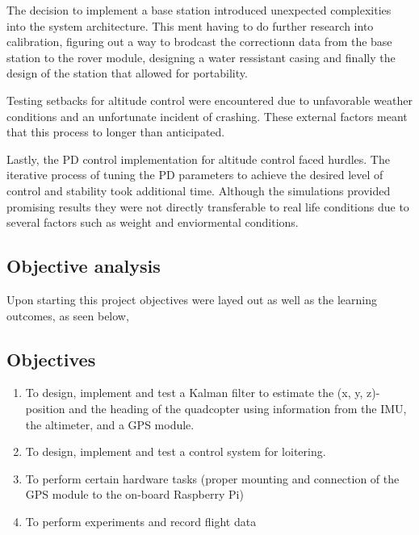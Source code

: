 \documentclass{article}
\begin{document}
The decision to implement a base station introduced unexpected complexities into
the system architecture. This ment having to do further research into
calibration, figuring out a way to brodcast the correctionn data from the base
station to the rover module, designing a water ressistant casing and finally the
design of the station that allowed for portability. 

Testing setbacks for altitude control were encountered due to unfavorable
weather conditions and an unfortunate incident of crashing. These external
factors meant that this process to longer than anticipated.

Lastly, the PD control implementation for altitude control faced hurdles. The
iterative process of tuning the PD parameters to achieve the desired level of
control and stability took additional time. Although the simulations provided
promising results they were not directly transferable to real life conditions
due to several factors such as weight and enviormental conditions.

\subsection{Objective analysis}
Upon starting this project objectives were layed out as well as the learning
outcomes, as seen below, 
\subsection*{Objectives}
\begin{enumerate}
  \item To design, implement and test a Kalman filter to estimate the (x, y, z)-
  position and the heading of the quadcopter using information from the IMU, the
  altimeter, and a GPS module.
  \item To design, implement and test a control system for loitering.
  \item To perform certain hardware tasks (proper mounting and connection of the
  GPS module to the on-board Raspberry Pi)
  \item To perform experiments and record flight data
\end{enumerate}
\end{document}

